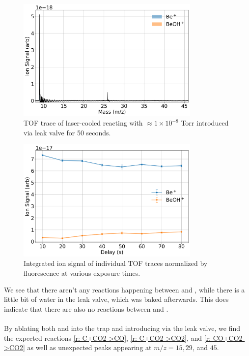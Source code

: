 \begin{figure}[H]
	\label{fig: Be+CO2 TOF}
	\centering
	\includegraphics[width=0.8\textwidth]{images/Be_CO2_TOF.png}
	\caption{TOF trace of laser-cooled  reacting with $\approx 1 \times 10^{-8}$ Torr  introduced via leak valve for 50 seconds.}
\end{figure}

\begin{figure}[H]
	\label{fig: Be+CO2 traces}
	\centering
	\includegraphics[width=0.8\textwidth]{images/Be_CO2_traces.png}
	\caption{Integrated ion signal of individual TOF traces normalized by  fluorescence at various  exposure times.}
\end{figure}

We see that there aren't any reactions happening between  and , while there is a little bit of water in the leak valve, which was baked afterwards. This does indicate that there are also no reactions between  and .

\paragraph{}
By ablating both  and  into the trap and introducing  via the leak valve, we find the expected reactions \ref{r: C+CO2->CO}, \ref{r: C+CO2->CO2}, and \ref{r: CO+CO2->CO2} as well as unexpected peaks appearing at $m/z=15, 29$, and $45$.

